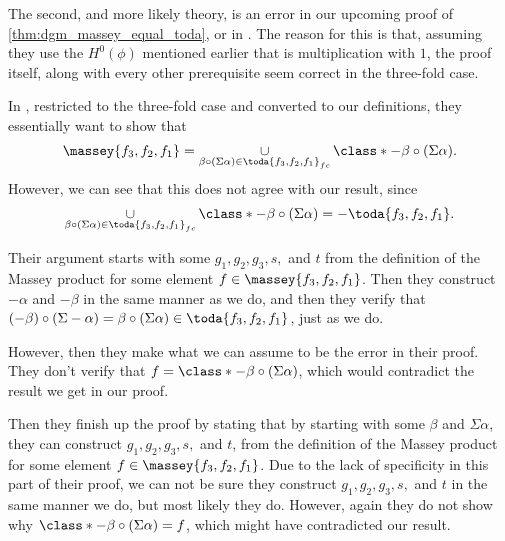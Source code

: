 \begin{remark}
    The second, and more likely theory, is an error in our upcoming proof of \autoref{thm:dgm_massey_equal_toda}, or in \cite[Proposition 4.2.8]{Jasso-Muro_2023}. The reason for this is that, assuming they use the \( H^0(\phi) \) mentioned earlier that is multiplication with \( 1 \), the proof itself, along with every other prerequisite seem correct in the three-fold case.

    In \cite[Proposition 4.2.8]{Jasso-Muro_2023}, restricted to the three-fold case and converted to our definitions, they essentially want to show that
    \[
        \massey{f_3, f_2, f_1} = \union_{\beta \circ (\Sigma \alpha) \in \toda{f_3, f_2, f_1}_{fc}}  \class*{- \beta \circ (\Sigma \alpha)}.
    \]
    However, we can see that this does not agree with our result, since
    \[
        \union_{\beta \circ (\Sigma \alpha) \in \toda{f_3, f_2, f_1}_{fc}}  \class*{- \beta \circ (\Sigma \alpha)} = -\toda{f_3, f_2, f_1}.
    \]

    Their argument starts with some \( g_1, g_2, g_3, s, \) and \( t \) from the definition of the Massey product for some element \( f \in \massey{f_3, f_2, f_1} \). Then they construct \( -\alpha \) and \( -\beta \) in the same manner as we do, and then they verify that \( (-\beta) \circ (\Sigma -\alpha) = \beta \circ (\Sigma \alpha) \in \toda{f_3, f_2, f_1} \), just as we do.

    However, then they make what we can assume to be the error in their proof. They don't verify that \( f = \class*{- \beta \circ (\Sigma \alpha)} \), which would contradict the result we get in our proof.

    Then they finish up the proof by stating that by starting with some \( \beta \) and \( \Sigma \alpha \), they can construct \( g_1, g_2, g_3, s, \) and \( t \), from the definition of the Massey product for some element \( f \in \massey{f_3, f_2, f_1} \). Due to the lack of specificity in this part of their proof, we can not be sure they construct \( g_1, g_2, g_3, s, \) and \( t \) in the same manner we do, but most likely they do. However, again they do not show why \( \class*{- \beta \circ (\Sigma \alpha)} = f \), which might have contradicted our result.
\end{remark}
